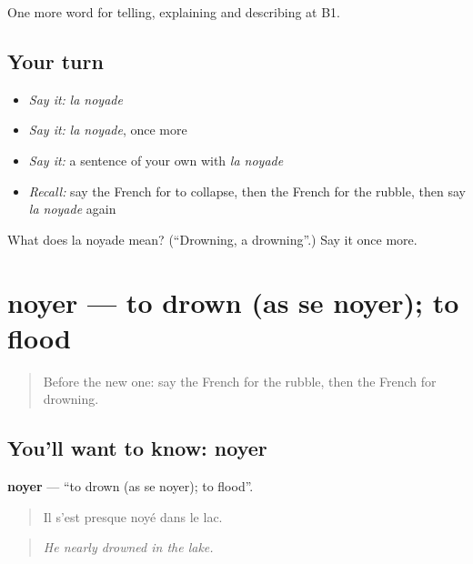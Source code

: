 \begin{grammarlens}[title={What you've built}]
One more word for telling, explaining and describing at B1.
\end{grammarlens}

\subsection*{Your turn}
\begin{itemize}
\raggedright
  \item \emph{Say it:} \emph{la noyade}
  \item \emph{Say it:} \emph{la noyade}, once more
  \item \emph{Say it:} a sentence of your own with \emph{la noyade}
  \item \emph{Recall:} say the French for to collapse, then the French for the rubble, then say \emph{la noyade} again
\end{itemize}

\begin{tcolorbox}[breakable,colback=teal!4,colframe=teal!35!black,title={Before you move on}]
What does la noyade mean? (\textquotedblleft{}Drowning, a drowning\textquotedblright{}.) Say it once more.
\end{tcolorbox}
\section[noyer]{noyer — to drown (as se noyer); to flood}

\label{lesson:FR-C304-noyer}



\begin{quote}
Before the new one: say the French for the rubble, then the French for drowning.
\end{quote}

\subsection*{You'll want to know: noyer}
\textbf{noyer} — \textquotedblleft{}to drown (as se noyer); to flood\textquotedblright{}.

\begin{quote}
Il s'est presque noyé dans le lac.
\end{quote}

\begin{quote}
\emph{He nearly drowned in the lake.}
\end{quote}

